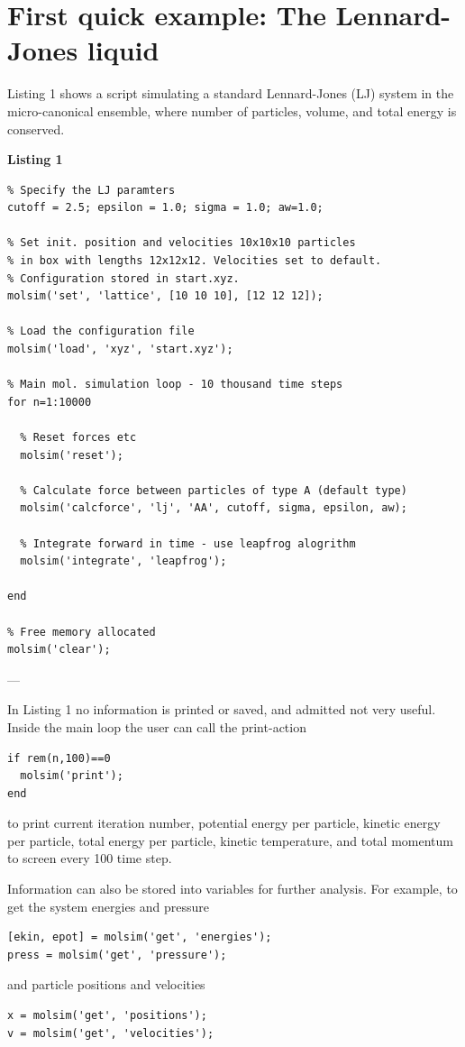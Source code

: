 \documentclass[11pt]{article}
\begin{document}
\section{First quick example: The Lennard-Jones liquid}
Listing 1 shows a script simulating a standard Lennard-Jones (LJ) system in the
micro-canonical ensemble, where number of particles, volume, and total energy is
conserved.

\bigskip

\noindent \textbf{Listing 1}
\begin{verbatim}
% Specify the LJ paramters
cutoff = 2.5; epsilon = 1.0; sigma = 1.0; aw=1.0;

% Set init. position and velocities 10x10x10 particles 
% in box with lengths 12x12x12. Velocities set to default. 
% Configuration stored in start.xyz. 
molsim('set', 'lattice', [10 10 10], [12 12 12]);

% Load the configuration file
molsim('load', 'xyz', 'start.xyz');

% Main mol. simulation loop - 10 thousand time steps
for n=1:10000

  % Reset forces etc
  molsim('reset');

  % Calculate force between particles of type A (default type)
  molsim('calcforce', 'lj', 'AA', cutoff, sigma, epsilon, aw);

  % Integrate forward in time - use leapfrog alogrithm
  molsim('integrate', 'leapfrog');
 
end

% Free memory allocated
molsim('clear');
\end{verbatim}
---

\noindent In Listing 1 no information is printed or saved, and admitted not very
useful. Inside the main loop the user can call the \textsf{print}-action
\begin{verbatim}
if rem(n,100)==0
  molsim('print');
end
\end{verbatim}
to print current iteration number, potential energy per particle, kinetic energy
per particle, total energy per particle, kinetic temperature, and total momentum
to screen every 100 time step.

Information can also be stored into variables for further analysis. For example,
to get the system energies and pressure
\begin{verbatim}
[ekin, epot] = molsim('get', 'energies');
press = molsim('get', 'pressure');
\end{verbatim}
and particle positions and velocities
\begin{verbatim}
x = molsim('get', 'positions');
v = molsim('get', 'velocities');
\end{verbatim}
\end{document}
